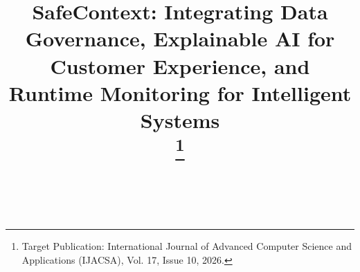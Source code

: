 \documentclass[journal]{IEEEtran}
\begin{document}
\title{SafeContext: Integrating Data Governance, Explainable AI for Customer Experience, and Runtime Monitoring for Intelligent Systems\\
\thanks{Target Publication: International Journal of Advanced Computer Science and Applications (IJACSA), Vol. 17, Issue 10, 2026.}
}

\author{\\
}

\maketitle
\end{document}
